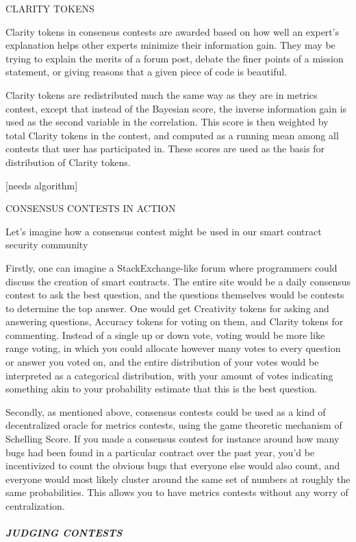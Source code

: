 CLARITY TOKENS

Clarity tokens in consensus contests are awarded based on how well an
expert's explanation helps other experts minimize their information
gain. They may be trying to explain the merits of a forum post, debate
the finer points of a mission statement, or giving reasons that a given
piece of code is beautiful.

Clarity tokens are redistributed much the same way as they are in
metrics contest, except that instead of the Bayesian score, the inverse
information gain is used as the second variable in the correlation. This
score is then weighted by total Clarity tokens in the contest, and
computed as a running mean among all contests that user has participated
in. These scores are used as the basis for distribution of Clarity
tokens.

{[}needs algorithm{]}

CONSENSUS CONTESTS IN ACTION

Let's imagine how a consensus contest might be used in our smart
contract security community

Firstly, one can imagine a StackExchange-like forum where programmers
could discuss the creation of smart contracts. The entire site would be
a daily consensus contest to ask the best question, and the questions
themselves would be contests to determine the top answer. One would get
Creativity tokens for asking and answering questions, Accuracy tokens
for voting on them, and Clarity tokens for commenting. Instead of a
single up or down vote, voting would be more like range voting, in which
you could allocate however many votes to every question or answer you
voted on, and the entire distribution of your votes would be interpreted
as a categorical distribution, with your amount of votes indicating
something akin to your probability estimate that this is the best
question.

Secondly, as mentioned above, consensus contests could be used as a kind
of decentralized oracle for metrics contests, using the game theoretic
mechanism of Schelling Score. If you made a consensus contest for
instance around how many bugs had been found in a particular contract
over the past year, you'd be incentivized to count the obvious bugs that
everyone else would also count, and everyone would most likely cluster
around the same set of numbers at roughly the same probabilities. This
allows you to have metrics contests without any worry of centralization.

\subparagraph{JUDGING CONTESTS}\label{judging-contests}

